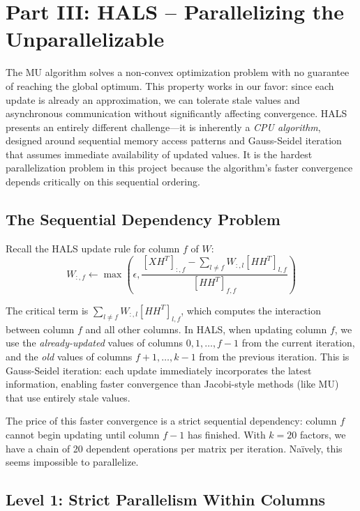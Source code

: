 \documentclass[11pt]{article}
\begin{document}
\section{Part III: HALS -- Parallelizing the Unparallelizable}

The MU algorithm solves a non-convex optimization problem with no guarantee of reaching the global optimum. This property works in our favor: since each update is already an approximation, we can tolerate stale values and asynchronous communication without significantly affecting convergence. HALS presents an entirely different challenge---it is inherently a \textit{CPU algorithm}, designed around sequential memory access patterns and Gauss-Seidel iteration that assumes immediate availability of updated values. It is the hardest parallelization problem in this project because the algorithm's faster convergence depends critically on this sequential ordering.

\subsection{The Sequential Dependency Problem}

Recall the HALS update rule for column $f$ of $W$:
\begin{equation}
W_{:,f} \leftarrow \max\left(\epsilon, \frac{[XH^T]_{:,f} - \sum_{l \neq f} W_{:,l} [HH^T]_{l,f}}{[HH^T]_{f,f}}\right)
\end{equation}

The critical term is $\sum_{l \neq f} W_{:,l} [HH^T]_{l,f}$, which computes the interaction between column $f$ and all other columns. In HALS, when updating column $f$, we use the \textit{already-updated} values of columns $0, 1, \ldots, f-1$ from the current iteration, and the \textit{old} values of columns $f+1, \ldots, k-1$ from the previous iteration. This is Gauss-Seidel iteration: each update immediately incorporates the latest information, enabling faster convergence than Jacobi-style methods (like MU) that use entirely stale values.

The price of this faster convergence is a strict sequential dependency: column $f$ cannot begin updating until column $f-1$ has finished. With $k=20$ factors, we have a chain of 20 dependent operations per matrix per iteration. Na\"ively, this seems impossible to parallelize.

\subsection{Level 1: Strict Parallelism Within Columns}
\end{document}
